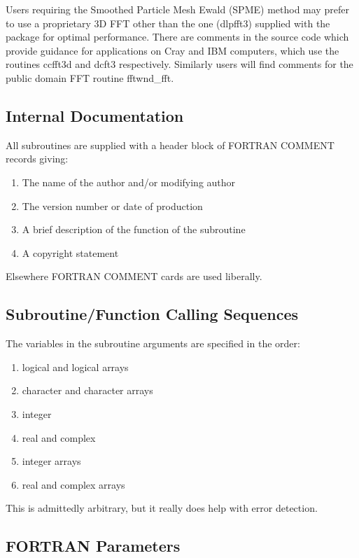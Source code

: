Users requiring the Smoothed Particle Mesh Ewald (SPME)
 method may prefer to use
a proprietary 3D FFT other than the one ({\sc dlpfft3}) supplied with
the package for optimal performance. There are comments in the source
code which provide guidance for applications on Cray and IBM
computers, which use the routines {\sc ccfft3d} and {\sc dcft3}
respectively. Similarly users will find comments for the public domain
FFT routine {\sc fftwnd\_fft}.

\subsection{Internal Documentation}

All subroutines are supplied with a header block of
FORTRAN COMMENT
records giving:

\begin{enumerate}
\item The name of the author and/or modifying author
\item The version number or date of production
\item A brief description of the function of the subroutine
\item A copyright statement
\end{enumerate}

Elsewhere FORTRAN COMMENT cards are used liberally.

\subsection{Subroutine/Function Calling Sequences}

The variables in the subroutine arguments are specified in the order:

\begin{enumerate}
\item logical and logical arrays
\item character and character arrays
\item integer
\item real and complex
\item integer arrays
\item real and complex arrays
\end{enumerate}

This is admittedly arbitrary, but it really does help with error detection.

\subsection{FORTRAN Parameters}

